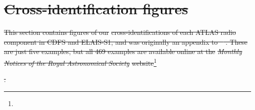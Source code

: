 \documentclass[11pt, a4paper]{book}
\providecommand{\DIFdeltex}[1]{{\protect\color{red}\sout{#1}}}                      %
\providecommand{\DIFdel}[1]{\texorpdfstring{\DIFdeltex{#1}}{}} %
\begin{document}
\section{\DIFdel{Cross-identification figures}}%
\addtocounter{section}{-1}%

\DIFdel{This section contains figures of our }%
\DIFdel{cross-identifications of each ATLAS radio component in CDFS and ELAIS-S1, and was originally an appendix to \mbox{%
\citet{alger18radio}}\hspace{0pt}%
. These are just five examples, but all 469 examples are available online at the }\emph{\DIFdel{Monthly Notices of the Royal Astronomical Society}} %
\DIFdel{website}\footnote{%
}%
\addtocounter{footnote}{-1}%
\DIFdel{.
}%
\end{document}
